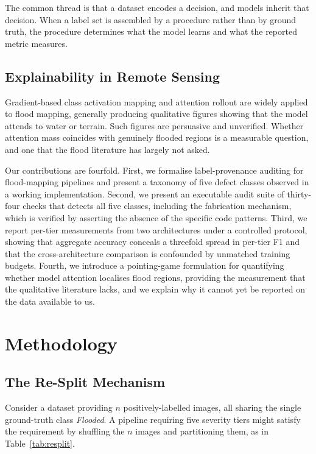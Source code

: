 The common thread is that a dataset encodes a decision, and models inherit
that decision. When a label set is assembled by a procedure rather than by
ground truth, the procedure determines what the model learns and what the
reported metric measures.

\subsection{Explainability in Remote Sensing}

Gradient-based class activation mapping \cite{b17} and attention rollout
\cite{b18} are widely applied to flood mapping, generally producing qualitative
figures showing that the model attends to water or terrain. Such figures are
persuasive and unverified. Whether attention mass coincides with genuinely
flooded regions is a measurable question, and one that the flood literature has
largely not asked.

Our contributions are fourfold. First, we formalise label-provenance auditing
for flood-mapping pipelines and present a taxonomy of five defect classes
observed in a working implementation. Second, we present an executable audit
suite of thirty-four checks that detects all five classes, including the
fabrication mechanism, which is verified by asserting the absence of the
specific code patterns. Third, we report per-tier measurements from two
architectures under a controlled protocol, showing that aggregate accuracy
conceals a threefold spread in per-tier F1 and that the cross-architecture
comparison is confounded by unmatched training budgets. Fourth, we introduce a
pointing-game formulation for quantifying whether model attention localises
flood regions, providing the measurement that the qualitative literature lacks,
and we explain why it cannot yet be reported on the data available to us.

\section{Methodology}
\label{sec:method}

\subsection{The Re-Split Mechanism}
\label{sec:resplit}

Consider a dataset providing $n$ positively-labelled images, all sharing the
single ground-truth class \emph{Flooded}. A pipeline requiring five severity
tiers might satisfy the requirement by shuffling the $n$ images and
partitioning them, as in Table~\ref{tab:resplit}.

